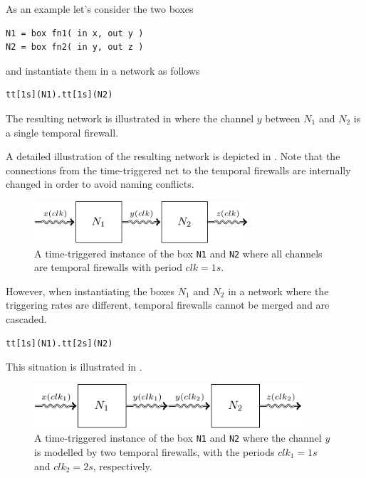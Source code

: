 As an example let's consider the two boxes
\begin{lstlisting}[numbers=none]
N1 = box fn1( in x, out y )
N2 = box fn2( in y, out z )
\end{lstlisting}
and instantiate them in a network as follows
\begin{lstlisting}[numbers=none]
tt[1s](N1).tt[1s](N2)
\end{lstlisting}
The resulting network is illustrated in \Fig{\ref{fig_smx_tt_ex1}} where the channel $y$ between $N_1$ and $N_2$ is a single temporal firewall.

A detailed illustration of the resulting network is depicted in \Fig{\ref{fig_smx_tt_ex1}}.
Note that the connections from the time-triggered net to the temporal firewalls are internally changed in order to avoid naming conflicts.
\begin{figure}[bht]\begin{center}
    \TopFigSpace
    \includegraphics[width=8cm]{fig/net_tt1.pdf}
    \CaptionFigSpace
    \caption{A time-triggered instance of the box \texttt{N1} and \texttt{N2} where all channels are temporal firewalls with period $clk = 1s$.}
    \label{fig_smx_tt_ex1}
    \BotFigSpace
\end{center}\end{figure}

However, when instantiating the boxes $N_1$ and $N_2$ in a network where the triggering rates are different, temporal firewalls cannot be merged and are cascaded.
\begin{lstlisting}[numbers=none]
tt[1s](N1).tt[2s](N2)
\end{lstlisting}
This situation is illustrated in \Fig{\ref{fig_smx_tt_ex2}}.
\begin{figure}[bht]\begin{center}
    \TopFigSpace
    \includegraphics[width=10cm]{fig/net_tt2.pdf}
    \CaptionFigSpace
    \caption{A time-triggered instance of the box \texttt{N1} and \texttt{N2} where the channel $y$ is modelled by two temporal firewalls, with the periods $clk_1 = 1s$ and $clk_2 = 2s$, respectively.}
    \label{fig_smx_tt_ex2}
    \BotFigSpace
\end{center}\end{figure}


